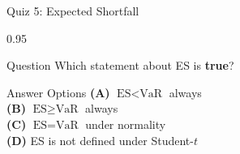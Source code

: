 \documentclass[9pt, aspectratio=169, t]{beamer}
\begin{document}
\begin{frame}{Quiz 5: Expected Shortfall}
\begin{cminipage}{0.95\textwidth}
    \begin{alertblock}{Question}
        Which statement about ES is \textbf{true}?
    \end{alertblock}

    \vspace{0.5cm}
    \begin{block}{Answer Options}
    \textcolor{MainBlue}{\textbf{(A)}} $\text{ES} < \text{VaR}$ always\\[3pt]
    \textcolor{MainBlue}{\textbf{(B)}} $\text{ES} \geq \text{VaR}$ always\\[3pt]
    \textcolor{MainBlue}{\textbf{(C)}} $\text{ES} = \text{VaR}$ under normality\\[3pt]
    \textcolor{MainBlue}{\textbf{(D)}} ES is not defined under Student-$t$
    \end{block}
\end{cminipage}
\end{frame}
\end{document}
